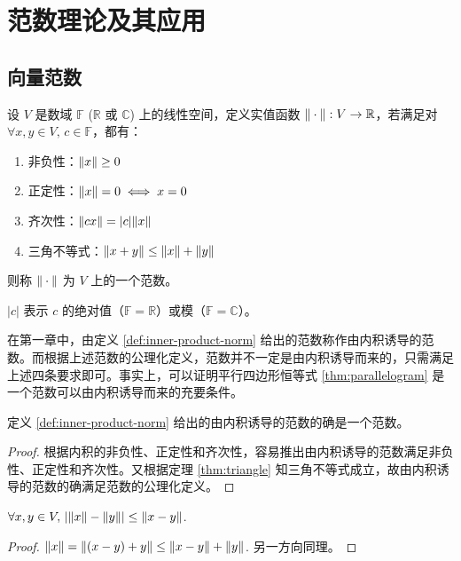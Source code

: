 \section{范数理论及其应用}

\subsection{向量范数}

\begin{definition}[向量范数]
设 $V$ 是数域 $\mathbb F$ ($\mathbb R$ 或 $\mathbb C$) 上的线性空间，定义实值函数 $\Vert\cdot\Vert:V\to\mathbb R$，若满足对 $\forall x,y\in V,\,c\in\mathbb F$，都有：
\begin{enumerate}
    \item 非负性：$\Vert x\Vert\geq0$
    \item 正定性：$\Vert x\Vert=0\iff x=0$
    \item 齐次性：$\Vert cx\Vert=|c|\Vert x\Vert$
    \item 三角不等式：$\Vert x+y\Vert\leq\Vert x\Vert+\Vert y\Vert$
\end{enumerate}
则称 $\Vert\cdot\Vert$ 为 $V$ 上的一个范数。
\end{definition}
\begin{com}
$|c|$ 表示 $c$ 的绝对值（$\mathbb F=\mathbb R$）或模（$\mathbb F=\mathbb C$）。
\end{com}

\begin{remark}
在第一章中，由定义 \ref{def:inner-product-norm} 给出的范数称作由内积诱导的范数。而根据上述范数的公理化定义，范数并不一定是由内积诱导而来的，只需满足上述四条要求即可。事实上，可以证明平行四边形恒等式 \ref{thm:parallelogram} 是一个范数可以由内积诱导而来的充要条件。
\end{remark}

\begin{theorem}[由内积诱导的范数]
定义 \ref{def:inner-product-norm} 给出的由内积诱导的范数的确是一个范数。
\end{theorem}
\begin{proof}
根据内积的非负性、正定性和齐次性，容易推出由内积诱导的范数满足非负性、正定性和齐次性。又根据定理 \ref{thm:triangle} 知三角不等式成立，故由内积诱导的范数的确满足范数的公理化定义。
\end{proof}

\begin{theorem}
$\forall x,y\in V,\,\left|\Vert x\Vert-\Vert y\Vert\right|\leq\Vert x-y\Vert$.
\end{theorem}
\begin{proof}
$\Vert x\Vert=\Vert(x-y)+y\Vert\leq\Vert x-y\Vert+\Vert y\Vert$. 另一方向同理。
\end{proof}

